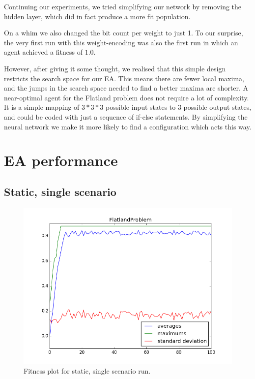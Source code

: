 \documentclass[twoside]{article}
\begin{document}
\begin{multicols}{2}
  Continuing our experiments,
  we tried simplifying our network by removing the hidden layer,
  which did in fact produce a more fit population.

  On a whim we also changed the bit count per weight to just 1.
  To our surprise,
  the very first run with this weight-encoding was also the first run in which an agent achieved a fitness of $1.0$.

  However, after giving it some thought,
  we realised that this simple design restricts the search space for our EA.
  This means there are fewer local maxima, 
  and the jumps in the search space needed to find a better maxima are shorter.
  A near-optimal agent for the Flatland problem does not require a lot of complexity.
  It is a simple mapping of $3*3*3$ possible input states to 3 possible output states,
  and could be coded with just a sequence of if-else statements.
  By simplifying the neural network we make it more likely to find a configuration which acts this way.

  \section{EA performance}

  \subsection{Static, single scenario}

  \begin{figure}[H]
    \centering
    \includegraphics[width=\linewidth]{images/static_1.png}
    \caption{Fitness plot for static, single scenario run.} \label{fig:static-single}
  \end{figure}


\end{multicols}
\end{document}

